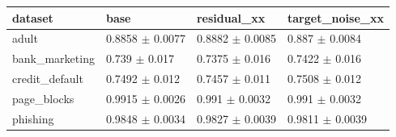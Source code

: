 \begin{tabular}{llll}
\toprule
dataset & base & residual\_xx & target\_noise\_xx \\
\midrule
adult & 0.8858 $\pm$ 0.0077 & 0.8882 $\pm$ 0.0085 & 0.887 $\pm$ 0.0084 \\
bank\_marketing & 0.739 $\pm$ 0.017 & 0.7375 $\pm$ 0.016 & 0.7422 $\pm$ 0.016 \\
credit\_default & 0.7492 $\pm$ 0.012 & 0.7457 $\pm$ 0.011 & 0.7508 $\pm$ 0.012 \\
page\_blocks & 0.9915 $\pm$ 0.0026 & 0.991 $\pm$ 0.0032 & 0.991 $\pm$ 0.0032 \\
phishing & 0.9848 $\pm$ 0.0034 & 0.9827 $\pm$ 0.0039 & 0.9811 $\pm$ 0.0039 \\
\bottomrule
\end{tabular}
